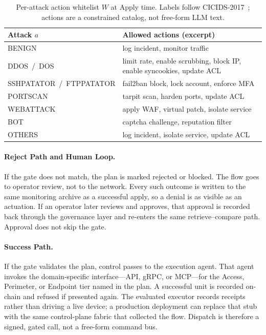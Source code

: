 \begin{table}[t]
\caption{Per-attack action whitelist $W$ at Apply time. Labels follow CICIDS-2017~\cite{sharafaldin2018}; actions are a constrained catalog, not free-form LLM text.}
\label{tab:whitelist}
\centering
\begin{tabular}{p{}p{}}
\hline
Attack $a$ & Allowed actions (excerpt) \\
\hline
BENIGN & log incident, monitor traffic \\
DDOS~/~DOS & limit rate, enable scrubbing, block IP, enable syncookies, update ACL \\
SSHPATATOR~/~FTPPATATOR & fail2ban block, lock account, enforce MFA \\
PORTSCAN & tarpit scan, harden ports, update ACL \\
WEBATTACK & apply WAF, virtual patch, isolate service \\
BOT & captcha challenge, reputation filter \\
OTHERS & log incident, isolate service, update ACL \\
\hline
\end{tabular}
\end{table}

\paragraph{Reject Path and Human Loop.}
If the gate does not match, the plan is marked rejected or blocked. The flow goes to operator review, not to the network. Every such outcome is written to the same monitoring archive as a successful apply, so a denial is as visible as an actuation. If an operator later reviews and approves, that approval is recorded back through the governance layer and re-enters the same retrieve--compare path. Approval does not skip the gate.

\paragraph{Success Path.}
If the gate validates the plan, control passes to the execution agent. That agent invokes the domain-specific interface---API, gRPC, or MCP---for the Access, Perimeter, or Endpoint tier named in the plan. A successful unit is recorded on-chain and refused if presented again. The evaluated executor records receipts rather than driving a live device; a production deployment can replace that stub with the same control-plane fabric that collected the flow. Dispatch is therefore a signed, gated call, not a free-form command bus.

